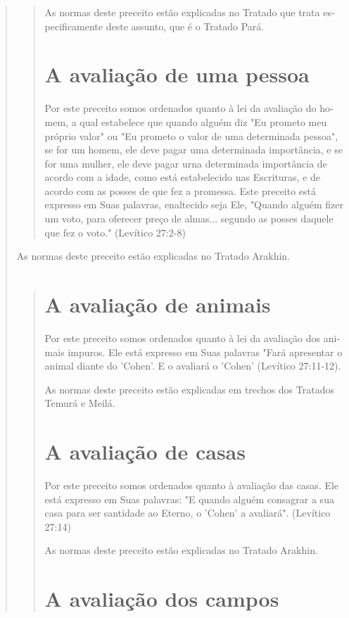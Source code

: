 \begin{quote}
\begin{quote}
As normas deste preceito estão explicadas no Tratado que trata
es­pecificamente deste assunto, que é o Tratado Pará.

\section{A avaliação de uma pessoa}

Por este preceito somos ordenados quanto à lei da avaliação do ho­mem, a
qual estabelece que quando alguém diz "Eu prometo meu próprio va­lor" ou
"Eu prometo o valor de uma determinada pessoa", se for um homem, ele
deve pagar uma determinada importância, e se for uma mulher, ele deve
pagar urna determinada importância de acordo com a idade, como está
estabe­lecido nas Escrituras, e de acordo com as posses de que fez a
promessa. Este preceito está expresso em Suas palavras, enaltecido seja
Ele, "Quando alguém fizer um voto, para oferecer preço de almas...
segundo as posses daquele que fez o voto." (Levítico 27:2-8)
\end{quote}

As normas deste preceito estão explicadas no Tratado Arakhin.

\begin{quote}
\section{A avaliação de animais}

Por este preceito somos ordenados quanto à lei da avaliação dos ani­mais
impuros. Ele está expresso em Suas palavras "Fará apresentar o animal
dian­te do 'Cohen'. E o avaliará o 'Cohen' (Levítico 27:11-12).

As normas deste preceito estão explicadas em trechos dos Tratados Temurá
e Meilá.

\section{A avaliação de casas}

Por este preceito somos ordenados quanto à avaliação das casas. Ele está
expresso em Suas palavras: "E quando alguém consagrar a sua casa para
ser santidade ao Eterno, o 'Cohen' a avaliará". (Levítico 27:14)

As normas deste preceito estão explicadas no Tratado Arakhin.

\section{A avaliação dos campos}


\end{quote}
\end{quote}
